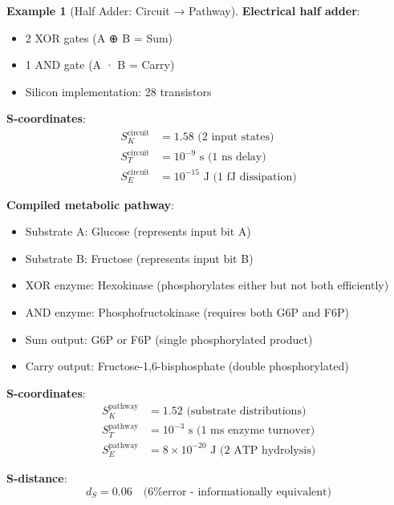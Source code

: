 \documentclass[11pt,a4paper]{article}
\theoremstyle{definition}
\newtheorem{example}[theorem]{Example}
\theoremstyle{remark}
\begin{document}
\begin{example}[Half Adder: Circuit → Pathway]
\textbf{Electrical half adder}:
\begin{itemize}
\item 2 XOR gates (A ⊕ B = Sum)
\item 1 AND gate (A · B = Carry)
\item Silicon implementation: 28 transistors
\end{itemize}

\textbf{S-coordinates}:
\begin{align}
S_K^{\text{circuit}} &= 1.58 \text{ (2 input states)} \\
S_T^{\text{circuit}} &= 10^{-9} \text{ s (1 ns delay)} \\
S_E^{\text{circuit}} &= 10^{-15} \text{ J (1 fJ dissipation)}
\end{align}

\textbf{Compiled metabolic pathway}:
\begin{itemize}
\item Substrate A: Glucose (represents input bit A)
\item Substrate B: Fructose (represents input bit B)
\item XOR enzyme: Hexokinase (phosphorylates either but not both efficiently)
\item AND enzyme: Phosphofructokinase (requires both G6P and F6P)
\item Sum output: G6P or F6P (single phosphorylated product)
\item Carry output: Fructose-1,6-bisphosphate (double phosphorylated)
\end{itemize}

\textbf{S-coordinates}:
\begin{align}
S_K^{\text{pathway}} &= 1.52 \text{ (substrate distributions)} \\
S_T^{\text{pathway}} &= 10^{-3} \text{ s (1 ms enzyme turnover)} \\
S_E^{\text{pathway}} &= 8 \times 10^{-20} \text{ J (2 ATP hydrolysis)}
\end{align}

\textbf{S-distance}:
\begin{equation}
d_S = 0.06 \quad \text{(6\% error - informationally equivalent)}
\end{equation}
\end{example}
\end{document}
